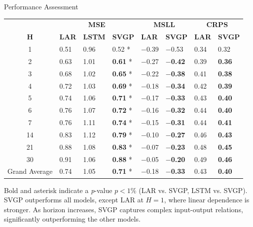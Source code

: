 \begin{frame}{Performance Assessment}


	\begin{table}[htbp]
			\scriptsize
		\begin{tabular}{c p{1cm}p{1.0cm}p{1.0cm}p{1.0cm}p{1.0cm}p{1.0cm}p{1.0cm}}
			\toprule
			& \multicolumn{3}{c}{\textbf{MSE}} & \multicolumn{2}{c}{\textbf{MSLL}} & \multicolumn{2}{c}{\textbf{CRPS}} \\
			\cmidrule{2-8}
			\( \textbf{H} \) & \textbf{LAR} & \textbf{LSTM} & \textbf{SVGP} & \textbf{LAR} & \textbf{SVGP} & \textbf{LAR} & \textbf{SVGP} \\
			\midrule
			1  & 0.51 & 0.96 & 0.52 * & $-$0.39 & $-$0.53 & 0.34 & 0.32 \\
			2  & 0.63 & 1.01 & \textbf{0.61} * & $-$0.27 & \textbf{$-$0.42} & 0.39 & \textbf{0.36} \\
			3  & 0.68 & 1.02 & \textbf{0.65} * & $-$0.22 & \textbf{$-$0.38} & 0.41 & \textbf{0.38} \\
			4  & 0.72 & 1.03 & \textbf{0.69} * & $-$0.18 & \textbf{$-$0.34} & 0.42 & \textbf{0.39} \\
			5  & 0.74 & 1.06 & \textbf{0.71} * & $-$0.17 & \textbf{$-$0.33} & 0.43 & \textbf{0.40} \\
			6  & 0.76 & 1.07 & \textbf{0.72} * & $-$0.16 & \textbf{$-$0.32} & 0.44 & \textbf{0.40} \\
			7  & 0.76 & 1.11 & \textbf{0.74} * & $-$0.15 & \textbf{$-$0.31} & 0.44 & \textbf{0.41} \\
			14 & 0.83 & 1.12 & \textbf{0.79} * & $-$0.10 & \textbf{$-$0.27} & 0.46 & \textbf{0.43} \\
			21 & 0.88 & 1.08 & \textbf{0.83} * & $-$0.07 & \textbf{$-$0.23} & 0.48 & \textbf{0.45} \\
			30 & 0.91 & 1.06 & \textbf{0.88} * & $-$0.05 & \textbf{$-$0.20} & 0.49 & \textbf{0.46} \\
			\midrule
			Grand Average & 0.74 & 1.05 & \textbf{0.71} * & $-$0.18 & \textbf{$-$0.33} & 0.43 & \textbf{0.40} \\
			\bottomrule
		\end{tabular}
	
	\end{table}

		\begin{block}{}
		Bold and asterisk indicate a \emph{p}-value $p<1\%$ (LAR vs. SVGP, LSTM vs. SVGP). SVGP outperforms all models, except LAR at $H=1$, where linear dependence is stronger. As horizon increases, SVGP captures complex input-output relations, significantly outperforming the other models.
	\end{block}
\end{frame}

